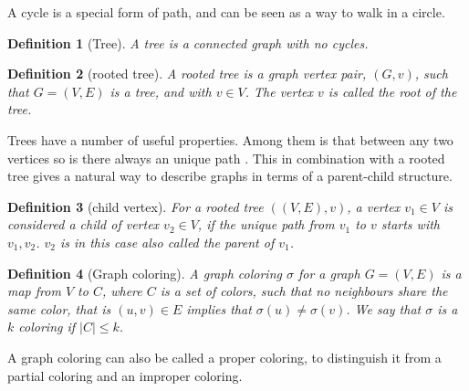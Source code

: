 \documentclass[a4paper]{article}
\newtheorem{definition}{Definition}[section]
\begin{document}
A cycle is a special form of path, and can be seen as a way to walk
in a circle. 

\begin{definition}[Tree]{\cite{Trees}}
    A tree is a connected graph with no cycles.
\end{definition}
\begin{definition}[rooted tree]{\cite{Trees}}
    A rooted tree is a graph vertex pair, $(G,v)$, such that $G = (V,E)$ is a tree,
    and  with $v \in V$. The vertex $v$ is called the root of the tree.
\end{definition}

Trees have a number of useful properties. Among them is that between any two
vertices so is there always an unique path \cite{Trees}. This in combination 
with a rooted tree gives a natural way to describe graphs in terms of a
parent-child structure.

\begin{definition}[child vertex]{\cite{Trees}}
    For a rooted tree $((V,E),v)$, a vertex $v_1 \in V$ is considered a child
    of vertex $v_2 \in V$, if the unique path from $v_1$ to $v$ starts with
    $v_1,v_2$. $v_2$ is in this case also called the parent of $v_1$.
\end{definition}


\begin{definition}[Graph coloring]
    A graph coloring $\sigma$ for a graph $G = (V,E)$ is a map from $V$ to $C$,
    where $C$ is a set of colors, such that no neighbours share the same color,
    that is $(u,v) \in E$ implies that $\sigma(u) \neq \sigma(v)$. We say that $\sigma$
    is a $k$ coloring if $|C| \leq k$.
\end{definition}
A graph coloring can also be called a proper coloring,
to distinguish it from a partial coloring and an improper coloring.
\end{document}
